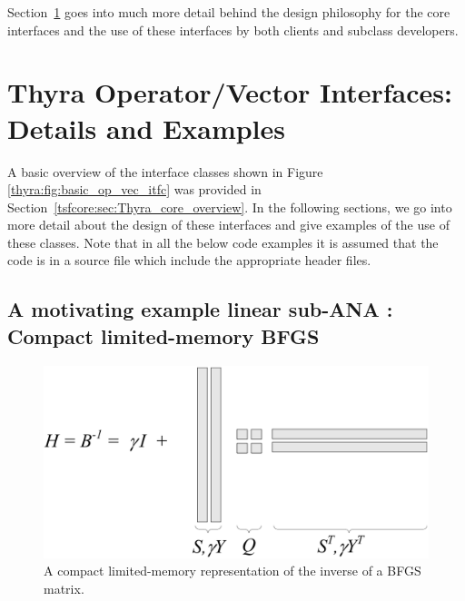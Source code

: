 \documentclass[pdf,ps2pdf,11pt]{SANDreport}
\begin{document}
Section~\ref{tsfcore:sec:Thyra_Details} goes into much more detail behind the
design philosophy for the core interfaces and the use of these interfaces by
both clients and subclass developers.

%
\section{Thyra Operator/Vector Interfaces: Details and Examples}
\label{tsfcore:sec:Thyra_Details}
%

A basic overview of the interface classes shown in Figure
{}\ref{thyra:fig:basic_op_vec_itfc} was provided in
Section~\ref{tsfcore:sec:Thyra_core_overview}.  In the following sections, we
go into more detail about the design of these interfaces and give examples of
the use of these classes.  Note that in all the below code examples it is
assumed that the code is in a source file which include the appropriate header
files.

%
\subsection{A motivating example linear sub-ANA : Compact limited-memory BFGS}
\label{tsfcore:sec:LBFGS}
%

{\bsinglespace
\begin{figure}[t]
\begin{center}
\includegraphics*[angle=0,scale=0.60]{figures/LBFGS}
\end{center}
\caption{
\label{tsfcore:fig:LBFGS}
A compact limited-memory representation of the inverse of a BFGS matrix.
}
\end{figure}
\esinglespace}
\end{document}
